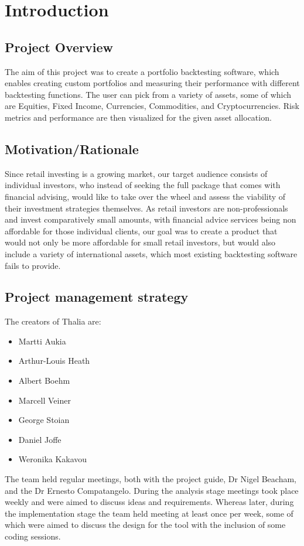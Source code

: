 \documentclass[main.tex]{subfiles}
\begin{document}
\section{Introduction}
\subsection {Project Overview}

The aim of this project was to create a portfolio backtesting software, which enables creating custom portfolios and measuring their performance with different backtesting functions. The user can pick from a variety of assets, some of which are Equities, Fixed Income, Currencies, Commodities, and Cryptocurrencies. Risk metrics and performance are then visualized for the given asset allocation.
\subsection{Motivation/Rationale}
Since retail investing is a growing market, our target audience consists of individual investors, who instead of seeking the full package that comes with financial advising, would like to take over the wheel and assess the viability of their investment strategies themselves. As retail investors are non-professionals and invest comparatively small amounts, with financial advice services being non affordable for those individual clients, our goal was to create a product that would not only be more affordable for small retail investors, but would also include a variety of international assets, which most existing backtesting software fails to provide.

\subsection{Project management strategy}

The creators of Thalia are:
\begin{itemize}
    \item Martti Aukia
    \item Arthur-Louis Heath
	\item Albert Boehm
	\item Marcell Veiner
	\item George Stoian
	\item Daniel Joffe
	\item Weronika Kakavou
\end{itemize}

The team held regular meetings, both with the project guide, Dr Nigel Beacham, and the Dr Ernesto Compatangelo. During the analysis stage meetings took place weekly and were aimed to discuss ideas and requirements. Whereas later, during the implementation stage the team held meeting at least once per week, some of which were aimed to discuss the design for the tool with the inclusion of some coding sessions.
\end{document}

